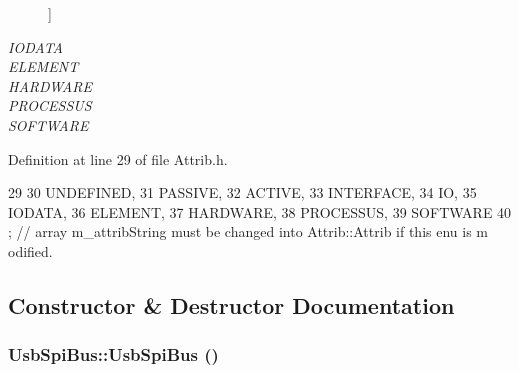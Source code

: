 \begin{Desc}
\begin{description}
{}]\item[{\em 
\hypertarget{classAttrib_a69e171d7cc6417835a5a306d3c764235a0af3b0d0ac323c1704e6c69cf90add28}{
IODATA}
\label{classAttrib_a69e171d7cc6417835a5a306d3c764235a0af3b0d0ac323c1704e6c69cf90add28}
}]\item[{\em 
\hypertarget{classAttrib_a69e171d7cc6417835a5a306d3c764235a7788bc5dd333fd8ce18562b269c9dab1}{
ELEMENT}
\label{classAttrib_a69e171d7cc6417835a5a306d3c764235a7788bc5dd333fd8ce18562b269c9dab1}
}]\item[{\em 
\hypertarget{classAttrib_a69e171d7cc6417835a5a306d3c764235a61ceb22149f365f1780d18f9d1459423}{
HARDWARE}
\label{classAttrib_a69e171d7cc6417835a5a306d3c764235a61ceb22149f365f1780d18f9d1459423}
}]\item[{\em 
\hypertarget{classAttrib_a69e171d7cc6417835a5a306d3c764235a75250e29692496e73effca2c0330977f}{
PROCESSUS}
\label{classAttrib_a69e171d7cc6417835a5a306d3c764235a75250e29692496e73effca2c0330977f}
}]\item[{\em 
\hypertarget{classAttrib_a69e171d7cc6417835a5a306d3c764235a103a67cd0b8f07ef478fa45d4356e27b}{
SOFTWARE}
\label{classAttrib_a69e171d7cc6417835a5a306d3c764235a103a67cd0b8f07ef478fa45d4356e27b}
}]\end{description}
\end{Desc}



Definition at line 29 of file Attrib.h.


\begin{DoxyCode}
29                 {
30     UNDEFINED,
31     PASSIVE,
32     ACTIVE,
33     INTERFACE,
34     IO,
35     IODATA,
36     ELEMENT,
37     HARDWARE,
38     PROCESSUS,
39     SOFTWARE 
40   }; // array m_attribString must be changed into Attrib::Attrib if this enu is m
      odified. 
\end{DoxyCode}


\subsection{Constructor \& Destructor Documentation}
\hypertarget{classUsbSpiBus_a75b47c1938d8ee80eb3a32f19765b05e}{
\subsubsection[{UsbSpiBus}]{\setlength{\rightskip}{0pt plus 5cm}UsbSpiBus::UsbSpiBus ()}}
\label{classUsbSpiBus_a75b47c1938d8ee80eb3a32f19765b05e}


